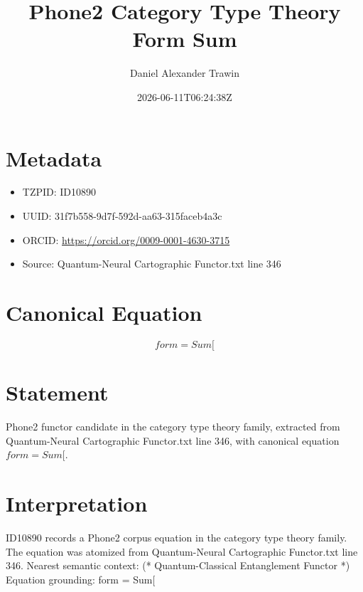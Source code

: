 \documentclass[11pt]{article}
\title{Phone2 Category Type Theory Form Sum}
\author{Daniel Alexander Trawin}
\date{2026-06-11T06:24:38Z}
\begin{document}
\maketitle
\section*{Metadata}
\begin{itemize}
\item TZPID: ID10890
\item UUID: 31f7b558-9d7f-592d-aa63-315faceb4a3c
\item ORCID: \url{https://orcid.org/0009-0001-4630-3715}
\item Source: Quantum-Neural Cartographic Functor.txt line 346
\end{itemize}
\section*{Canonical Equation}
\[
form = Sum[
\]
\section*{Statement}
Phone2 functor candidate in the category type theory family, extracted from Quantum-Neural Cartographic Functor.txt line 346, with canonical equation $form = Sum[$.
\section*{Interpretation}
ID10890 records a Phone2 corpus equation in the category type theory family. The equation was atomized from Quantum-Neural Cartographic Functor.txt line 346. Nearest semantic context: (* Quantum-Classical Entanglement Functor *) Equation grounding: form = Sum[
\end{document}
